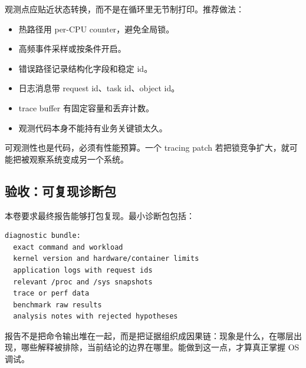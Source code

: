 观测点应贴近状态转换，而不是在循环里无节制打印。推荐做法：

\begin{itemize}
\tightlist
\item 热路径用 per-CPU counter，避免全局锁。
\item 高频事件采样或按条件开启。
\item 错误路径记录结构化字段和稳定 id。
\item 日志消息带 request id、task id、object id。
\item trace buffer 有固定容量和丢弃计数。
\item 观测代码本身不能持有业务关键锁太久。
\end{itemize}

可观测性也是代码，必须有性能预算。一个 tracing patch 若把锁竞争扩大，就可能把被观察系统变成另一个系统。

\subsection{验收：可复现诊断包}

本卷要求最终报告能够打包复现。最小诊断包包括：

\begin{lstlisting}
diagnostic bundle:
  exact command and workload
  kernel version and hardware/container limits
  application logs with request ids
  relevant /proc and /sys snapshots
  trace or perf data
  benchmark raw results
  analysis notes with rejected hypotheses
\end{lstlisting}

报告不是把命令输出堆在一起，而是把证据组织成因果链：现象是什么，在哪层出现，哪些解释被排除，当前结论的边界在哪里。能做到这一点，才算真正掌握 OS 调试。
